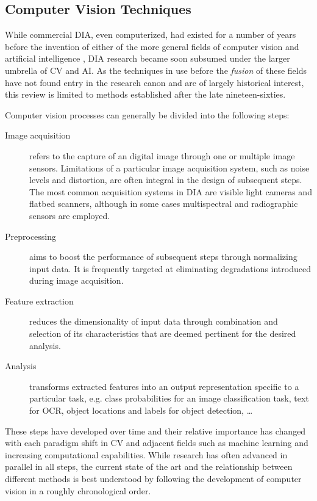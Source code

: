 \subsection{Computer Vision Techniques}
\label{ss:techniques}

While commercial DIA, even computerized, had existed for a number of years
before the invention of either of the more general fields of computer vision
and artificial intelligence \cite[pg. 11-14]{herbert1982history}, DIA research
became soon subsumed under the larger umbrella of CV and AI. As the techniques
in use before the \emph{fusion} of these fields have not found entry in the
research canon and are of largely historical interest, this review is limited
to methods established after the late nineteen-sixties.

Computer vision processes can generally be divided into the following steps: 

\begin{description}
	\item[Image acquisition] refers to the capture of an digital image
		through one or multiple image sensors. Limitations of a
		particular image acquisition system, such as noise levels and
		distortion, are often integral in the design of subsequent
		steps. The most common acquisition systems in DIA are visible
		light cameras and flatbed scanners, although in some cases
		multispectral and radiographic sensors are employed.
	\item[Preprocessing] aims to boost the performance of subsequent steps
		through normalizing input data. It is frequently targeted at
		eliminating degradations introduced during image acquisition.
	\item[Feature extraction] reduces the dimensionality of input data
		through combination and selection of its characteristics that
		are deemed pertinent for the desired analysis. 
	\item[Analysis] transforms extracted features into an output
		representation specific to a particular task, e.g. class
		probabilities for an image classification task, text for OCR,
		object locations and labels for object detection, \dots
\end{description}

These steps have developed over time and their relative importance has changed
with each paradigm shift in CV and adjacent fields such as machine learning and
increasing computational capabilities. While research has often advanced in
parallel in all steps, the current state of the art and the relationship
between different methods is best understood by following the development of
computer vision in a roughly chronological order.

